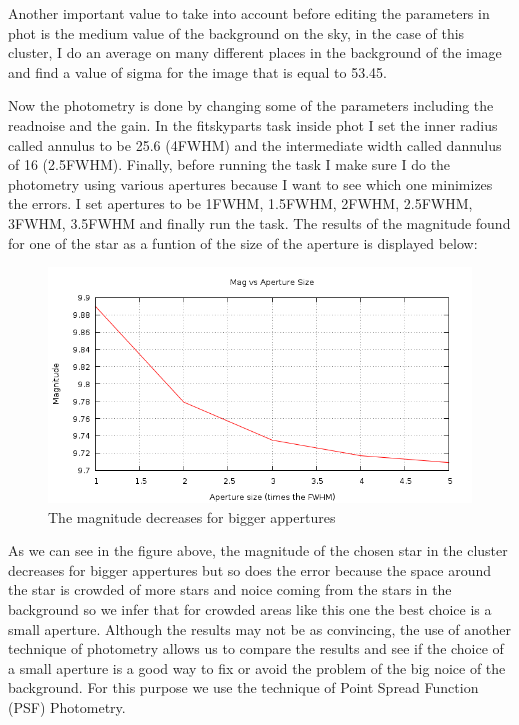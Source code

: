 Another important value to take into account before editing the parameters in phot is the medium value of the background on the sky, in the case of this cluster, I do an average on many different places in the background of the image and find a value of sigma for the image that is equal to 53.45.

Now the photometry is done by changing some of the parameters including the readnoise and the gain. In the fitskyparts task inside phot I set the inner radius called annulus to be 25.6 (4FWHM) and the intermediate width called dannulus of 16 (2.5FWHM). Finally, before running the task I make sure I do the photometry using various apertures because I want to see which one minimizes the errors. I set apertures to be 1FWHM, 1.5FWHM, 2FWHM, 2.5FWHM, 3FWHM, 3.5FWHM and finally run the task. The results of the magnitude found for one of the star as a funtion of the size of the aperture is displayed below:

\begin{figure}[H]
\centering
\includegraphics[width=12cm]{images/mag_vs_ap_size.png}
\caption{The magnitude decreases for bigger appertures}
\end{figure}

As we can see in the figure above, the magnitude of the chosen star in the cluster decreases for bigger appertures but so does the error because the space around the star is crowded of more stars and noice coming from the stars in the background so we infer that for crowded areas like this one the best choice is a small aperture. Although the results may not be as convincing, the use of another technique of photometry allows us to compare the results and see if the choice of a small aperture is a good way to fix or avoid the problem of the big noice of the background. For this purpose we use the technique of Point Spread Function (PSF) Photometry.

